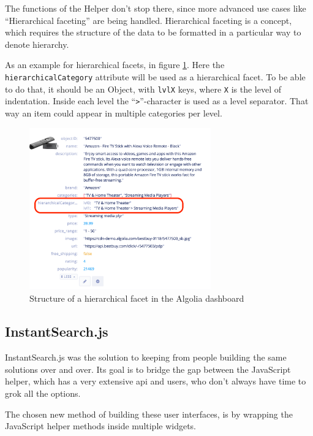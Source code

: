 The functions of the Helper don't stop there, since more advanced use cases like ``Hierarchical faceting''\cite{hierarchical-faceting} are being handled. Hierarchical faceting is a concept, which requires the structure of the data to be formatted in a particular way to denote hierarchy. 

As an example for hierarchical facets, in figure \ref{figure:hierarchical-facets}. Here the {\tt hierarchicalCategory} \gls{attribute} will be used as a hierarchical facet. To be able to do that, it should be an Object, with {\tt lvlX} keys, where {\tt X} is the level of indentation. Inside each level the ``{\tt >}''-character is used as a level separator. That way an item could appear in multiple categories per level.

\begin{figure}[H]
  \centering
  \includegraphics[width=0.7\textwidth]{../assets/hierarchical-dashboard.png}
  \caption{Structure of a hierarchical facet in the Algolia dashboard}
  \label{figure:hierarchical-facets}
\end{figure}


\subsection{InstantSearch.js} %
\label{sub:instantsearch_js}

InstantSearch.js was the solution to keeping from people building the same solutions over and over. Its goal is to bridge the gap between the JavaScript helper, which has a very extensive \acrshort{api} and users, who don't always have time to grok all the options. 

The chosen new method of building these user interfaces, is by wrapping the JavaScript helper methods inside multiple widgets. %

